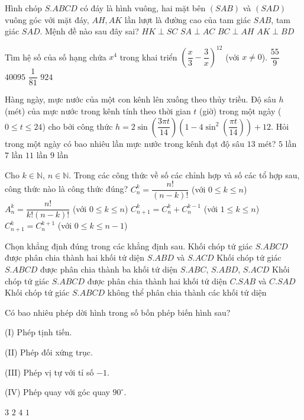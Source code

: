 \begin{ex}%
Hình chóp $S.ABCD$ có đáy là hình vuông, hai mặt bên $(SAB)$ và $(SAD)$ vuông góc với mặt đáy, $AH,AK$ lần lượt là đường cao của tam giác $SAB$, tam giác $SAD$. Mệnh đề nào sau đây sai?
\choice
{$HK \perp SC$}
{$SA \perp AC$}
{$BC \perp AH$}
{\True $AK \perp BD$}
\end{ex}

\begin{ex}%
Tìm hệ số của số hạng chứa $x^4$ trong khai triển $\left (\dfrac{x}{3} -\dfrac{3}{x}\right )^{12}$ (với $x \neq 0$).
\choice
{$\dfrac{55}{9}$}
{\True $40095$}
{$\dfrac{1}{81}$}
{$924$}
\end{ex}

\begin{ex}%
Hàng ngày, mực nước của một con kênh lên xuống theo thủy triều. Độ sâu $h$ (mét) của mực nước trong kênh tính theo thời gian $t$ (giờ) trong một ngày ($0 \leq t \leq 24$) cho bởi công thức $h=2\sin \left (\dfrac{3\pi t}{14}\right ) \left (1-4\sin^2 \left (\dfrac{\pi t}{14}\right ) \right ) +12$. Hỏi trong một ngày có bao nhiêu lần mực nước trong kênh đạt độ sâu $13$ mét?
\choice
{$5$ lần}
{$7$ lần}
{$11$ lần}
{\True $9$ lần}
\end{ex}

\begin{ex}%
Cho $k \in \mathbb{N}$, $n \in \mathbb{N}$. Trong các công thức về số các chỉnh hợp và số các tổ hợp sau, công thức nào là công thức đúng?
\choice
{$C_n^k = \dfrac{n!}{(n-k)!}$ (với $0 \leq k \leq n$)}
{$A_n^k = \dfrac{n!}{k!(n-k)!}$ (với $0 \leq k \leq n$)}
{\True $C_{n+1}^k = C_n^k + C_n^{k-1}$ (với $1 \leq k \leq n$)}
{$C_{n+1}^k =  C_n^{k+1}$ (với $0 \leq k \leq n-1$)}
\end{ex}

\begin{ex}%
Chọn khẳng định đúng trong các khẳng định sau.
\choice
{Khối chóp tứ giác $S.ABCD$ được phân chia thành hai khối tứ diện $S.ABD$ và $S.ACD$}
{Khối chóp tứ giác $S.ABCD$ được phân chia thành ba khối tứ diện $S.ABC$, $S.ABD$, $S. ACD$}
{\True Khối chóp tứ giác $S.ABCD$ được phân chia thành hai khối tứ diện $C.SAB$ và $C.SAD$}
{Khối chóp tứ giác $S.ABCD$ không thể phân chia thành các khối tứ diện}
\end{ex}

\begin{ex}%
Có bao nhiêu phép dời hình trong số bốn phép biến hình sau? 
\begin{multicols}{2}
\item[(I)] Phép tịnh tiến. 
\item[(II)] Phép đối xứng trục. 
\item[(III)] Phép vị tự với tỉ số $-1$. 
\item[(IV)] Phép quay với góc quay $90^\circ$.
\end{multicols}
\choice
{$3$}
{$2$}
{\True $4$}
{$1$}
\end{ex}

